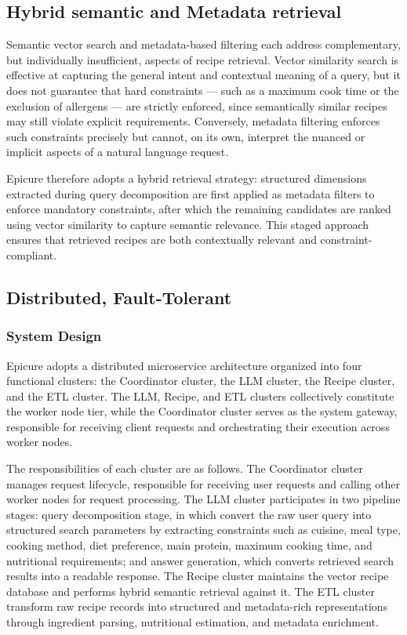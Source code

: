 \documentclass[conference]{IEEEtran}
\begin{document}
\subsection{Hybrid semantic and Metadata retrieval}
Semantic vector search and metadata-based filtering each address complementary, but individually insufficient, aspects of recipe retrieval. Vector similarity search is effective at capturing the general intent and contextual meaning of a query, but it does not guarantee that hard constraints — such as a maximum cook time or the exclusion of allergens — are strictly enforced, since semantically similar recipes may still violate explicit requirements. Conversely, metadata filtering enforces such constraints precisely but cannot, on its own, interpret the nuanced or implicit aspects of a natural language request.

Epicure therefore adopts a hybrid retrieval strategy: structured dimensions extracted during query decomposition are first applied as metadata filters to enforce mandatory constraints, after which the remaining candidates are ranked using vector similarity to capture semantic relevance. This staged approach ensures that retrieved recipes are both contextually relevant and constraint-compliant.

\subsection{Distributed, Fault-Tolerant}
\subsubsection{System Design}
Epicure adopts a distributed microservice architecture organized into four functional clusters: the Coordinator cluster, the LLM cluster, the Recipe cluster, and the ETL cluster. The LLM, Recipe, and ETL clusters collectively constitute the worker node tier, while the Coordinator cluster serves as the system gateway, responsible for receiving client requests and orchestrating their execution across worker nodes.


The responsibilities of each cluster are as follows. The Coordinator cluster manages request lifecycle, responsible for receiving user requests and calling other worker nodes for request processing. The LLM cluster participates in two pipeline stages:  query decomposition stage, in which convert the raw user query into structured search parameters by extracting constraints such as cuisine, meal type, cooking method, diet preference, main protein, maximum cooking time, and nutritional requirements; and answer generation, which converts retrieved search results into a readable response. The Recipe cluster maintains the vector recipe database and performs hybrid semantic retrieval against it. The ETL cluster transform raw recipe records into structured and metadata-rich representations through ingredient parsing, nutritional estimation, and metadata enrichment.
\end{document}
